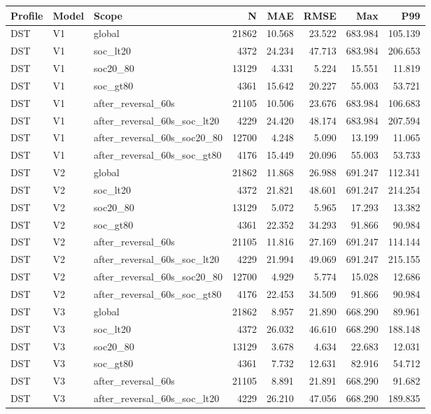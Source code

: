 \begin{tabular}{lllrrrrr}
\hline
Profile & Model & Scope & N & MAE & RMSE & Max & P99 \\
\hline
DST & V1 & global & 21862 & 10.568 & 23.522 & 683.984 & 105.139 \\
DST & V1 & soc\_lt20 & 4372 & 24.234 & 47.713 & 683.984 & 206.653 \\
DST & V1 & soc20\_80 & 13129 & 4.331 & 5.224 & 15.551 & 11.819 \\
DST & V1 & soc\_gt80 & 4361 & 15.642 & 20.227 & 55.003 & 53.721 \\
DST & V1 & after\_reversal\_60s & 21105 & 10.506 & 23.676 & 683.984 & 106.683 \\
DST & V1 & after\_reversal\_60s\_soc\_lt20 & 4229 & 24.420 & 48.174 & 683.984 & 207.594 \\
DST & V1 & after\_reversal\_60s\_soc20\_80 & 12700 & 4.248 & 5.090 & 13.199 & 11.065 \\
DST & V1 & after\_reversal\_60s\_soc\_gt80 & 4176 & 15.449 & 20.096 & 55.003 & 53.733 \\
DST & V2 & global & 21862 & 11.868 & 26.988 & 691.247 & 112.341 \\
DST & V2 & soc\_lt20 & 4372 & 21.821 & 48.601 & 691.247 & 214.254 \\
DST & V2 & soc20\_80 & 13129 & 5.072 & 5.965 & 17.293 & 13.382 \\
DST & V2 & soc\_gt80 & 4361 & 22.352 & 34.293 & 91.866 & 90.984 \\
DST & V2 & after\_reversal\_60s & 21105 & 11.816 & 27.169 & 691.247 & 114.144 \\
DST & V2 & after\_reversal\_60s\_soc\_lt20 & 4229 & 21.994 & 49.069 & 691.247 & 215.155 \\
DST & V2 & after\_reversal\_60s\_soc20\_80 & 12700 & 4.929 & 5.774 & 15.028 & 12.686 \\
DST & V2 & after\_reversal\_60s\_soc\_gt80 & 4176 & 22.453 & 34.509 & 91.866 & 90.984 \\
DST & V3 & global & 21862 & 8.957 & 21.890 & 668.290 & 89.961 \\
DST & V3 & soc\_lt20 & 4372 & 26.032 & 46.610 & 668.290 & 188.148 \\
DST & V3 & soc20\_80 & 13129 & 3.678 & 4.634 & 22.683 & 12.031 \\
DST & V3 & soc\_gt80 & 4361 & 7.732 & 12.631 & 82.916 & 54.712 \\
DST & V3 & after\_reversal\_60s & 21105 & 8.891 & 21.891 & 668.290 & 91.682 \\
DST & V3 & after\_reversal\_60s\_soc\_lt20 & 4229 & 26.210 & 47.056 & 668.290 & 189.835 \\

\end{tabular}
